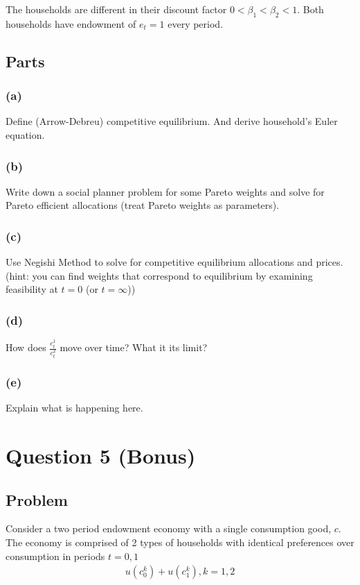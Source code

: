 \documentclass[10pt, a4paper]{article}
\begin{document}
The households are different in their discount factor $0 < \beta_1 < \beta_2 < 1$. Both households have endowment of $e_t = 1$ every period.

\subsection*{Parts}
\subsubsection*{(a)}
Define (Arrow-Debreu) competitive equilibrium. And derive household's Euler equation.

\subsubsection*{(b)}
Write down a social planner problem for some Pareto weights and solve for Pareto efficient allocations (treat Pareto weights as parameters).

\subsubsection*{(c)}
Use Negishi Method to solve for competitive equilibrium allocations and prices. (hint: you can find weights that correspond to equilibrium by examining feasibility at $t = 0$ (or $t = \infty$))

\subsubsection*{(d)}
How does $\frac{c^1_t}{c^2_t}$ move over time? What it its limit?

\subsubsection*{(e)}
Explain what is happening here.

\section*{Question 5 (Bonus)}
\subsection*{Problem}
Consider a two period endowment economy with a single consumption good, $c$. The economy is comprised of 2 types of households with identical preferences over consumption in periods $t = 0,1$
\begin{gather*}
  u(c^k_0) + u(c^k_1), k = 1,2
\end{gather*}
\end{document}
